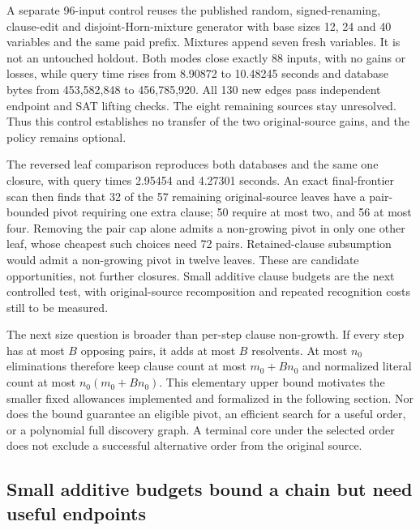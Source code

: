 \documentclass[11pt,a4paper]{article}
\numberwithin{equation}{section}
\theoremstyle{plain}
\theoremstyle{definition}
\theoremstyle{remark}
\begin{document}
A separate 96-input control reuses the published random, signed-renaming, clause-edit and disjoint-Horn-mixture generator with base sizes 12, 24 and 40 variables and the same paid prefix. Mixtures append seven fresh variables. It is not an untouched holdout. Both modes close exactly 88 inputs, with no gains or losses, while query time rises from 8.90872 to 10.48245 seconds and database bytes from 453,582,848 to 456,785,920. All 130 new edges pass independent endpoint and SAT lifting checks. The eight remaining sources stay unresolved. Thus this control establishes no transfer of the two original-source gains, and the policy remains optional.

The reversed leaf comparison reproduces both databases and the same one closure, with query times 2.95454 and 4.27301 seconds. An exact final-frontier scan then finds that 32 of the 57 remaining original-source leaves have a pair-bounded pivot requiring one extra clause; 50 require at most two, and 56 at most four. Removing the pair cap alone admits a non-growing pivot in only one other leaf, whose cheapest such choices need 72 pairs. Retained-clause subsumption would admit a non-growing pivot in twelve leaves. These are candidate opportunities, not further closures. Small additive clause budgets are the next controlled test, with original-source recomposition and repeated recognition costs still to be measured.

The next size question is broader than per-step clause non-growth. If every step has at most $B$ opposing pairs, it adds at most $B$ resolvents. At most $n_0$ eliminations therefore keep clause count at most $m_0+Bn_0$ and normalized literal count at most $n_0(m_0+Bn_0)$. This elementary upper bound motivates the smaller fixed allowances implemented and formalized in the following section. Nor does the bound guarantee an eligible pivot, an efficient search for a useful order, or a polynomial full discovery graph. A terminal core under the selected order does not exclude a successful alternative order from the original source.

\subsection{Small additive budgets bound a chain but need useful endpoints}
\label{sec:additive-elimination}
\end{document}
